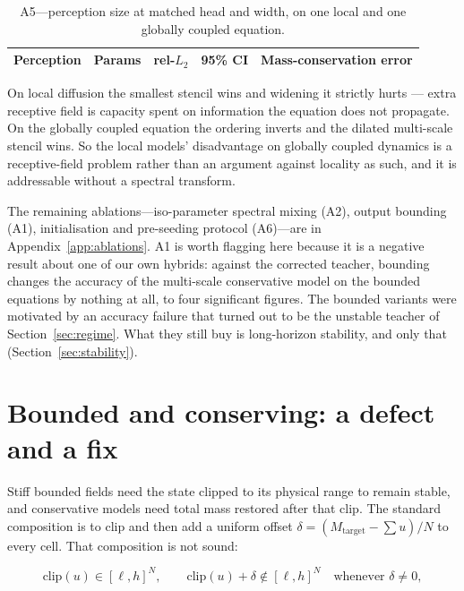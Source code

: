 \documentclass{article}
\begin{document}
\begin{table}[h]
\centering
\caption{A5---perception size at matched head and width, on one local and one globally
coupled equation.}
\label{tab:a5}
\small
\begin{tabular}{lrccc}
\toprule
Perception & Params & rel-$L_2$ & 95\% CI & Mass-conservation error \\
\midrule

\bottomrule
\end{tabular}
\end{table}

On local diffusion the smallest stencil wins and widening it strictly hurts --- extra
receptive field is capacity spent on information the equation does not propagate. On the
globally coupled equation the ordering inverts and the dilated multi-scale stencil wins.
So the local models' disadvantage on globally coupled dynamics is a receptive-field problem
rather than an argument against locality as such, and it is addressable without a spectral
transform.

The remaining ablations---iso-parameter spectral mixing (A2), output bounding (A1),
initialisation and pre-seeding protocol (A6)---are in Appendix~\ref{app:ablations}. A1 is
worth flagging here because it is a negative result about one of our own hybrids: against
the corrected teacher, bounding changes the accuracy of the multi-scale conservative model
on the bounded equations by nothing at all, to four significant figures. The bounded variants
were motivated by an accuracy failure that turned out to be the unstable teacher of
Section~\ref{sec:regime}. What they still buy is long-horizon stability, and only that
(Section~\ref{sec:stability}).

\section{Bounded and conserving: a defect and a fix}
\label{sec:proj}

Stiff bounded fields need the state clipped to its physical range to remain stable, and
conservative models need total mass restored after that clip. The standard composition is
to clip and then add a uniform offset $\delta = (M_{\text{target}} - \sum u)/N$ to every
cell. That composition is not sound:

\begin{equation}
\text{clip}(u) \in [\ell, h]^N,
\qquad
\text{clip}(u) + \delta \notin [\ell, h]^N \quad\text{whenever } \delta \neq 0,
\end{equation}
\end{document}
